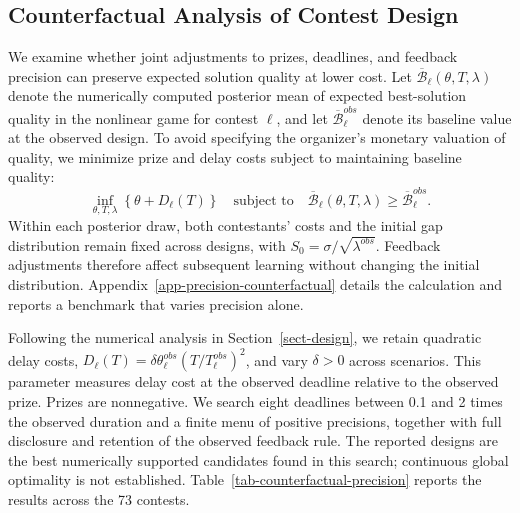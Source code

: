 \documentclass[mnsc]{informs3}
\begin{document}
\subsection{Counterfactual Analysis of Contest Design}\label{sect-precision-design}

We examine whether joint adjustments to prizes, deadlines, and feedback precision can preserve expected solution quality at lower cost. Let $\overline{\mathcal B}_\ell(\theta,T,\lambda)$ denote the numerically computed posterior mean of expected best-solution quality in the nonlinear game for contest $\ell$, and let $\overline{\mathcal B}^{obs}_\ell$ denote its baseline value at the observed design. To avoid specifying the organizer's monetary valuation of quality, we minimize prize and delay costs subject to maintaining baseline quality:
\begin{equation}\label{eq-empirical-joint-design}
\inf_{\theta,T,\lambda}\left\{\theta+D_\ell(T)\right\}
\quad\text{subject to}\quad
\overline{\mathcal B}_\ell(\theta,T,\lambda)\geq \overline{\mathcal B}^{obs}_\ell.
\end{equation}
Within each posterior draw, both contestants' costs and the initial gap distribution remain fixed across designs, with $S_0=\sigma/\sqrt{\lambda^{obs}}$. Feedback adjustments therefore affect subsequent learning without changing the initial distribution. Appendix~\ref{app-precision-counterfactual} details the calculation and reports a benchmark that varies precision alone.

Following the numerical analysis in Section~\ref{sect-design}, we retain quadratic delay costs, $D_\ell(T)=\delta\theta_\ell^{obs}(T/T_\ell^{obs})^2$, and vary $\delta>0$ across scenarios. This parameter measures delay cost at the observed deadline relative to the observed prize. Prizes are nonnegative. We search eight deadlines between 0.1 and 2 times the observed duration and a finite menu of positive precisions, together with full disclosure and retention of the observed feedback rule. The reported designs are the best numerically supported candidates found in this search; continuous global optimality is not established. Table~\ref{tab-counterfactual-precision} reports the results across the 73 contests.
\end{document}
